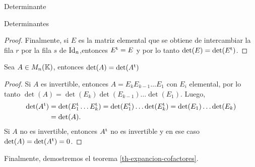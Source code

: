 \begin{chapter}{Determinante}
\begin{section}{Determinantes}
\begin{proof}
      Finalmente, si $E$ es la  matriz elemental que se obtiene de intercambiar la fila $r$ por la fila $s$ de $\operatorname{Id}_n$,entonces $E^{\operatorname{t}} = E$ y por lo tanto $\det(E) = \det(E^{\operatorname{t}})$.
  \end{proof}

  \begin{teorema}\label{th-det-a-trans-app}
      Sea $A \in M_n(\mathbb K)$,  entonces
      $\det(A) = \det(A^{\operatorname{t}})$
  \end{teorema}
  \begin{proof}
      Si $A$ es invertible, entonces  $A = E_kE_{k-1}\ldots E_1$ con $E_i$ elemental, por lo tanto $\det(A) = \det( E_k)\det(E_{k-1})\ldots \det(E_1)$. Luego,
      \begin{align*}
          \det(A^{\operatorname{t}}) & = \det(E_1^{\operatorname{t}} \ldots E_k^{\operatorname{t}}) = \det(E_1^{\operatorname{t}}) \ldots \det(E_k^{\operatorname{t}}) =
          \det(E_1) \ldots \det(E_k)                                                     \\&= \det(A).
      \end{align*}
      Si $A$ no es invertible, entonces $A^{\operatorname{t}}$ no es invertible y en ese caso $\det(A) = \det(A^{\operatorname{t}})=0$.
  \end{proof}

  Finalmente,  demostremos el teorema \ref{th-expancion-cofactores}.


\end{section}
\end{chapter}
